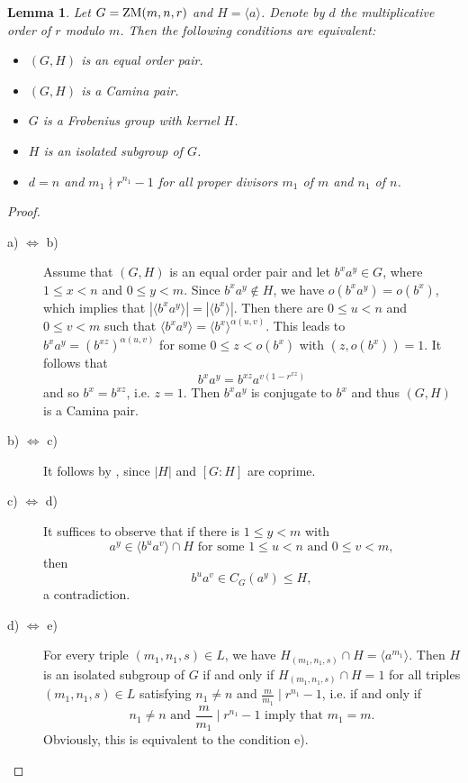 \documentclass[12pt]{article}
\newtheorem{lemma}[theorem]{Lemma}
\newcommand{\0}{{\leqno}}
\begin{document}
\begin{lemma}
Let $G={\rm ZM}(m,n,r)$ and $H=\langle a\rangle$. Denote by $d$ the multiplicative order of $r$ modulo $m$. Then the following conditions are equivalent: 
\begin{itemize}
\item[{\rm a)}] $(G,H)$ is an equal order pair.
\item[{\rm b)}] $(G,H)$ is a Camina pair.
\item[{\rm c)}] $G$ is a Frobenius group with kernel $H$.
\item[{\rm d)}] $H$ is an isolated subgroup of $G$.
\item[{\rm e)}] $d=n$ and $m_1\nmid r^{n_1}-1$ for all proper divisors $m_1$ of $m$ and $n_1$ of $n$.
\end{itemize}
\end{lemma}
\begin{proof}
\begin{description}
\item[{\rm a)} $\Leftrightarrow$ {\rm b)}] Assume that $(G,H)$ is an equal order pair and let $b^xa^y\in G$, where $1\leq x<n$ and $0\leq y<m$. Since $b^xa^y\not\in H$, we have $o(b^xa^y)=o(b^x)$, which implies that $|\langle b^xa^y\rangle|=|\langle b^x\rangle|$. Then there are $0\leq u<n$ and $0\leq v<m$ such that $\langle b^xa^y\rangle=\langle b^x\rangle^{\alpha(u,v)}$. This leads to $b^xa^y=(b^{xz})^{\alpha(u,v)}$ for some $0\leq z<o(b^x)$ with $(z,o(b^x))=1$. It follows that
\begin{equation}
b^xa^y=b^{xz}a^{v(1-r^{xz})}\nonumber    
\end{equation}and so $b^x=b^{xz}$, i.e. $z=1$. Then $b^xa^y$ is conjugate to $b^x$ and thus $(G,H)$ is a Camina pair.
\item[{\rm b)} $\Leftrightarrow$ {\rm c)}] It follows by \cite{6}, since $|H|$ and $[G:H]$ are coprime.
\item[{\rm c)} $\Leftrightarrow$ {\rm d)}] It suffices to observe that if there is $1\leq y<m$ with
\begin{equation}
a^y\in\langle b^ua^v\rangle\cap H \mbox{ for some } 1\leq u<n \mbox{ and } 0\leq v<m,\nonumber 
\end{equation}then 
\begin{equation}
b^ua^v\in C_G(a^y)\leq H,\nonumber 
\end{equation}a contradiction.
\item[{\rm d)} $\Leftrightarrow$ {\rm e)}] For every triple $(m_1,n_1,s)\in L$, we have $H_{(m_1,n_1,s)}\cap H=\langle a^{m_1}\rangle$. Then $H$ is an isolated subgroup of $G$ if and only if $H_{(m_1,n_1,s)}\cap H=1$ for all triples $(m_1,n_1,s)\in L$ satisfying $n_1\neq n$ and $\frac{m}{m_1}\mid r^{n_1}-1$, i.e. if and only if
\begin{equation}
n_1\neq n \mbox{ and } \frac{m}{m_1}\mid r^{n_1}-1 \mbox{ imply that } m_1=m.\nonumber 
\end{equation}Obviously, this is equivalent to the condition e).
\end{description}
\end{proof}
\end{document}
